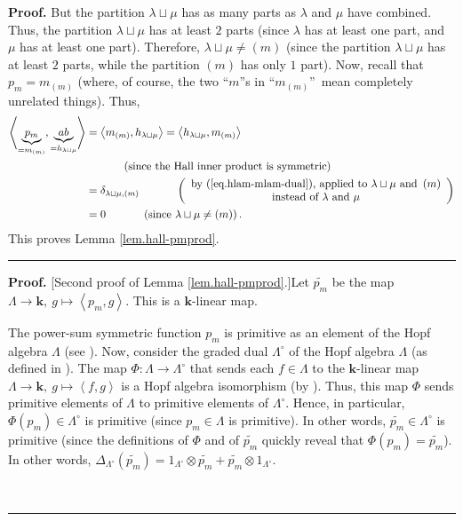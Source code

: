\documentclass[numbers=enddot,12pt,final,onecolumn,notitlepage]{scrartcl}%
\theoremstyle{definition}
\newenvironment{proof}[1][Proof]{\noindent\textbf{#1.} }{\ \rule{0.5em}{0.5em}}
\newenvironment{verlong}{}{}
\begin{document}
\begin{verlong}
\begin{proof}
But the partition $\lambda\sqcup\mu$ has as many parts as $\lambda$ and $\mu$
have combined. Thus, the partition $\lambda\sqcup\mu$ has at least $2$ parts
(since $\lambda$ has at least one part, and $\mu$ has at least one part).
Therefore, $\lambda\sqcup\mu\neq\left(  m\right)  $ (since the partition
$\lambda\sqcup\mu$ has at least $2$ parts, while the partition $\left(
m\right)  $ has only $1$ part). Now, recall that $p_{m}=m_{\left(  m\right)
}$ (where, of course, the two \textquotedblleft$m$\textquotedblright s in
\textquotedblleft$m_{\left(  m\right)  }$\textquotedblright\ mean completely
unrelated things). Thus,%
\begin{align*}
\left\langle \underbrace{p_{m}}_{=m_{\left(  m\right)  }},\underbrace{ab}%
_{=h_{\lambda\sqcup\mu}}\right\rangle  &  =\left\langle m_{\left(  m\right)
},h_{\lambda\sqcup\mu}\right\rangle =\left\langle h_{\lambda\sqcup\mu
},m_{\left(  m\right)  }\right\rangle \\
&  \ \ \ \ \ \ \ \ \ \ \left(  \text{since the Hall inner product is
symmetric}\right) \\
&  =\delta_{\lambda\sqcup\mu,\left(  m\right)  }\ \ \ \ \ \ \ \ \ \ \left(
\begin{array}
[c]{c}%
\text{by (\ref{eq.hlam-mlam-dual}), applied to }\lambda\sqcup\mu\text{ and
}\left(  m\right) \\
\text{instead of }\lambda\text{ and }\mu
\end{array}
\right) \\
&  =0\ \ \ \ \ \ \ \ \ \ \left(  \text{since }\lambda\sqcup\mu\neq\left(
m\right)  \right)  .
\end{align*}
This proves Lemma \ref{lem.hall-pmprod}.
\end{proof}

\begin{proof}
[Second proof of Lemma \ref{lem.hall-pmprod}.]Let $\widetilde{p_{m}}$ be the
map $\Lambda\rightarrow\mathbf{k},\ g\mapsto\left\langle p_{m},g\right\rangle
$. This is a $\mathbf{k}$-linear map.

The power-sum symmetric function $p_{m}$ is primitive as an element of the
Hopf algebra $\Lambda$ (see \cite[Proposition 2.3.6(i)]{GriRei}). Now,
consider the graded dual $\Lambda^{\circ}$ of the Hopf algebra $\Lambda$ (as
defined in \cite[\S 1.6]{GriRei}). The map $\Phi:\Lambda\rightarrow
\Lambda^{\circ}$ that sends each $f\in\Lambda$ to the $\mathbf{k}$-linear map
$\Lambda\rightarrow\mathbf{k},\ g\mapsto\left\langle f,g\right\rangle $ is a
Hopf algebra isomorphism (by \cite[Corollary 2.5.14]{GriRei}). Thus, this map
$\Phi$ sends primitive elements of $\Lambda$ to primitive elements of
$\Lambda^{\circ}$. Hence, in particular, $\Phi\left(  p_{m}\right)  \in
\Lambda^{\circ}$ is primitive (since $p_{m}\in\Lambda$ is primitive). In other
words, $\widetilde{p_{m}}\in\Lambda^{\circ}$ is primitive (since the
definitions of $\Phi$ and of $\widetilde{p_{m}}$ quickly reveal that
$\Phi\left(  p_{m}\right)  =\widetilde{p_{m}}$). In other words,
$\Delta_{\Lambda^{\circ}}\left(  \widetilde{p_{m}}\right)  =1_{\Lambda^{\circ
}}\otimes\widetilde{p_{m}}+\widetilde{p_{m}}\otimes1_{\Lambda^{\circ}}$.


\end{proof}
\end{verlong}
\end{document}
